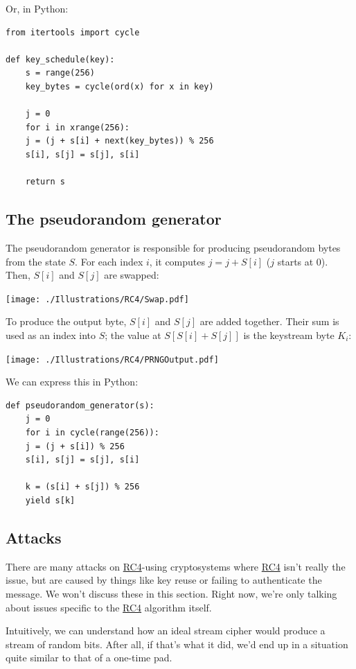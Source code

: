 \documentclass[11pt,ebook,table,dvipsnames]{memoir}
\begin{document}
Or, in Python:

\begin{verbatim}
from itertools import cycle

def key_schedule(key):
    s = range(256)
    key_bytes = cycle(ord(x) for x in key)

    j = 0
    for i in xrange(256):
	j = (j + s[i] + next(key_bytes)) % 256
	s[i], s[j] = s[j], s[i]

    return s
\end{verbatim}
\subsection{The pseudorandom generator}
\label{sec-2-3-11-2}

The pseudorandom generator is responsible for producing pseudorandom
bytes from the state $S$. For each index $i$, it computes $j = j +
S[i]$ ($j$ starts at 0). Then, $S[i]$ and $S[j]$ are swapped:

\texttt{[image: ./Illustrations/RC4/Swap.pdf]}

To produce the output byte, $S[i]$ and $S[j]$ are added together.
Their sum is used as an index into $S$; the value at $S[S[i] + S[j]]$
is the keystream byte $K_i$:

\texttt{[image: ./Illustrations/RC4/PRNGOutput.pdf]}

We can express this in Python:

\begin{verbatim}
def pseudorandom_generator(s):
    j = 0
    for i in cycle(range(256)):
	j = (j + s[i]) % 256
	s[i], s[j] = s[j], s[i]

	k = (s[i] + s[j]) % 256
	yield s[k]
\end{verbatim}
\subsection{Attacks}
\label{sec-2-3-11-3}

There are many attacks on \hyperref[RC4]{RC4}-using cryptosystems where \hyperref[RC4]{RC4} isn't
really the issue, but are caused by things like key reuse or failing
to authenticate the message. We won't discuss these in this section.
Right now, we're only talking about issues specific to the \hyperref[RC4]{RC4}
algorithm itself.

Intuitively, we can understand how an ideal stream cipher would
produce a stream of random bits. After all, if that's what it did,
we'd end up in a situation quite similar to that of a one-time pad.
\end{document}
